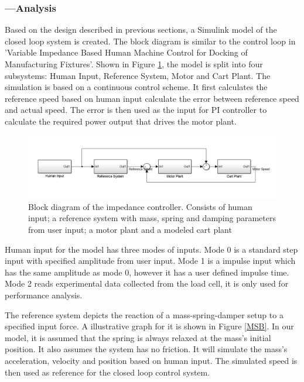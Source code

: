 \subsubsection*{ ---Analysis}
Based on the design described in previous sections, a Simulink model of the closed loop system is created. The block diagram is similar to the control loop in 'Variable Impedance Based Human Machine Control for Docking of Manufacturing Fixtures'\cite{toni}. Shown in Figure \ref{fig:ControlLoop}, the model is split into four subsystems: Human Input, Reference System, Motor and Cart Plant. The simulation is based on a continuous control scheme. It first calculates the reference speed based on human input calculate the error between reference speed and actual speed. The error is then used as the input for PI controller to calculate the required power output that drives the motor plant.

\begin{figure}[htbp]
\centering
\includegraphics[width=1\linewidth]{Images/ControlLoop}
\caption{Block diagram of the impedance controller. Consists of human input; a reference system with mass, spring and damping parameters from user input; a motor plant and a modeled cart plant}
\label{fig:ControlLoop}
\end{figure}

Human input for the model has three modes of inputs. Mode 0 is a standard step input with specified amplitude from user input. Mode 1 is a impulse input which has the same amplitude as mode 0, however it has a user defined impulse time. Mode 2 reads experimental data collected from the load cell, it is only used for performance analysis.

The reference system depicts the reaction of a mass-spring-damper setup to a specified input force. A illustrative graph for it is shown in Figure \ref{MSB}. In our model, it is assumed that the spring is always relaxed at the mass's initial position. It also assumes the system has no friction. It will simulate the mass's acceleration, velocity and position based on human input. The simulated speed is then used as reference for the closed loop control system.

